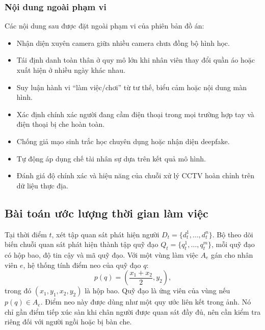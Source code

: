 \subsubsection{Nội dung ngoài phạm vi}
Các nội dung sau được đặt ngoài phạm vi của phiên bản đồ án:
\begin{itemize}
\item Nhận diện xuyên camera giữa nhiều camera chưa đồng bộ hình học.
\item Tái định danh toàn thân ở quy mô lớn khi nhân viên thay đổi quần áo hoặc xuất hiện ở nhiều ngày khác nhau.
\item Suy luận hành vi ``làm việc/chơi'' từ tư thế, biểu cảm hoặc nội dung màn hình.
\item Xác định chính xác người đang cầm điện thoại trong mọi trường hợp tay và điện thoại bị che hoàn toàn.
\item Chống giả mạo sinh trắc học chuyên dụng hoặc nhận diện deepfake.
\item Tự động áp dụng chế tài nhân sự dựa trên kết quả mô hình.
\item Đánh giá độ chính xác và hiệu năng của chuỗi xử lý CCTV hoàn chỉnh trên dữ liệu thực địa.
\end{itemize}

\subsection{Bài toán ước lượng thời gian làm việc}
Tại thời điểm $t$, xét tập quan sát phát hiện người $D_t=\{d_t^1,\ldots,d_t^n\}$. Bộ theo dõi biến chuỗi quan sát phát hiện thành tập quỹ đạo $Q_t=\{q_t^1,\ldots,q_t^m\}$, mỗi quỹ đạo có hộp bao, độ tin cậy và mã quỹ đạo. Với một vùng làm việc $A_e$ gán cho nhân viên $e$, hệ thống tính điểm neo của quỹ đạo $q$:
\begin{equation}
 p(q)=\left(\frac{x_1+x_2}{2},y_2\right),
 \label{eq:anchor}
\end{equation}
trong đó $(x_1,y_1,x_2,y_2)$ là hộp bao. Quỹ đạo là ứng viên của vùng nếu $p(q)\in A_e$. Điểm neo này được dùng như một quy ước liên kết trong ảnh. Nó chỉ gần điểm tiếp xúc sàn khi chân người được quan sát đầy đủ, nên cần kiểm tra riêng đối với người ngồi hoặc bị bàn che.

